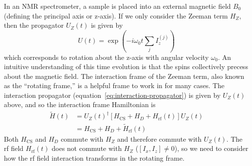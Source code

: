 In an NMR spectrometer, a sample is placed into an external magnetic field $B_0$ (defining the principal axis or z-axis).
If we only consider the Zeeman term $H_Z$, then the propagator $U_Z(t)$ is given by
\[
U(t) = \exp \left( -i \omega_0 t \sum_j I_z^{(j)} \right)
\]
which corresponds to rotation about the z-axis with angular velocity $\omega_0$. An intuitive understanding of this time evolution is that the spins collectively precess about the magnetic field. The interaction frame of the Zeeman term, also known as the ``rotating frame,'' is a helpful frame to work in for many cases. The interaction propagator (equation~\ref{eq:interaction-propagator}) is given by $U_Z(t)$ above, and so the interaction frame Hamiltonian is
\begin{align*}
    \widetilde{H}(t) &= {U_Z(t)}^{\dagger} \left[ H_\text{CS} + H_D + H_\text{rf}(t) \right] U_Z(t) \\
        &= H_\text{CS} + H_D + \widetilde{H}_\text{rf}(t)
\end{align*}
Both $H_\text{CS}$ and $H_D$ commute with $H_Z$ and therefore commute with $U_Z(t)$. The rf field $H_\text{rf}(t)$ does not commute with $H_Z$ ($[I_x, I_z] \ne 0$), so we need to consider how the rf field interaction transforms in the rotating frame.

